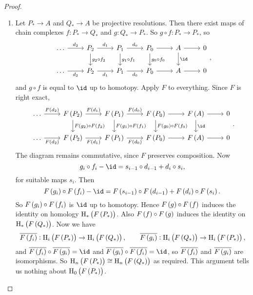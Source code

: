 \begin{proof}
\hfill
\begin{enumerate}
\item Let $ P_* \to A $ and $ Q_* \to A $ be projective resolutions. Then there exist maps of chain complexes $ f : P_* \to Q_* $ and $ g : Q_* \to P_* $. So $ g \circ f : P_* \to P_* $, so
$$
\begin{tikzcd}
\dots \arrow{r}{d_2} & P_2 \arrow{r}{d_1} \arrow{d}{g_2 \circ f_2} & P_1 \arrow{r}{d_0} \arrow{d}{g_1 \circ f_1} & P_0 \arrow{r} \arrow{d}{g_0 \circ f_0} & A \arrow{r} \arrow{d}{\id} & 0 \\
\dots \arrow[swap]{r}{d_2} & P_2 \arrow[swap]{r}{d_1} & P_1 \arrow[swap]{r}{d_0} & P_0 \arrow{r} & A \arrow{r} & 0
\end{tikzcd},
$$
and $ g \circ f $ is equal to $ \id $ up to homotopy. Apply $ F $ to everything. Since $ F $ is right exact,
$$
\begin{tikzcd}
\dots \arrow{r}{F\br{d_2}} & F\br{P_2} \arrow{r}{F\br{d_1}} \arrow{d}{F\br{g_2} \circ F\br{f_2}} & F\br{P_1} \arrow{r}{F\br{d_0}} \arrow{d}{F\br{g_1} \circ F\br{f_1}} & F\br{P_0} \arrow{r} \arrow{d}{F\br{g_0} \circ F\br{f_0}} & F\br{A} \arrow{r} \arrow{d}{\id} & 0 \\
\dots \arrow[swap]{r}{F\br{d_2}} & F\br{P_2} \arrow[swap]{r}{F\br{d_1}} & F\br{P_1} \arrow[swap]{r}{F\br{d_0}} & F\br{P_0} \arrow{r} & F\br{A} \arrow{r} & 0
\end{tikzcd}.
$$
The diagram remains commutative, since $ F $ preserves composition. Now
$$ g_i \circ f_i - \id = s_{i - 1} \circ d_{i - 1} + d_i \circ s_i, $$
for suitable maps $ s_i $. Then
$$ F\br{g_i} \circ F\br{f_i} - \id = F\br{s_{i - 1}} \circ F\br{d_{i - 1}} + F\br{d_i} \circ F\br{s_i}. $$
So $ F\br{g_i} \circ F\br{f_i} $ is $ \id $ up to homotopy. Hence $ F\br{g} \circ F\br{f} $ induces the identity on homology $ \H_*\br{F\br{P_*}} $. Also $ F\br{f} \circ F\br{g} $ induces the identity on $ \H_*\br{F\br{Q_*}} $. Now we have
$$ \overline{F\br{f_i}} : \H_i\br{F\br{P_*}} \to \H_i\br{F\br{Q_*}}, \qquad \overline{F\br{g_i}} : \H_i\br{F\br{Q_*}} \to \H_i\br{F\br{P_*}}, $$
and $ \overline{F\br{f_i}} \circ \overline{F\br{g_i}} = \id $ and $ \overline{F\br{g_i}} \circ \overline{F\br{f_i}} = \id $, so $ \overline{F\br{f_i}} $ and $ \overline{F\br{g_i}} $ are isomorphisms. So $ \H_n\br{F\br{P_*}} \cong \H_n\br{F\br{Q_*}} $ as required. This argument tells us nothing about $ \H_0\br{F\br{P_*}} $.

\pagebreak


\end{enumerate}
\end{proof}
